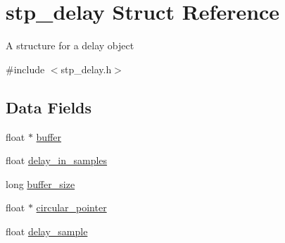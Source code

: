 \hypertarget{structstp__delay}{}\section{stp\+\_\+delay Struct Reference}
\label{structstp__delay}


A structure for a delay object ~\newline
  




{\ttfamily \#include $<$stp\+\_\+delay.\+h$>$}

\subsection*{Data Fields}
\begin{DoxyCompactItemize}
\item 
float $\ast$ \hyperlink{structstp__delay_afa761c0753ecc94346e155a39bd9ed9c}{buffer}
\item 
float \hyperlink{structstp__delay_a1e57a43103f17324d4e3f4132fc8d195}{delay\+\_\+in\+\_\+samples}
\item 
long \hyperlink{structstp__delay_ac0b5d1ec75d16c57ad6376f09c9693ca}{buffer\+\_\+size}
\item 
float $\ast$ \hyperlink{structstp__delay_a8ae11daccf5b56bb5a49c9a99956d23a}{circular\+\_\+pointer}
\item 
float \hyperlink{structstp__delay_ab1cecaf78849bc3aadab1ef39c4f45b7}{delay\+\_\+sample}
\end{DoxyCompactItemize}
